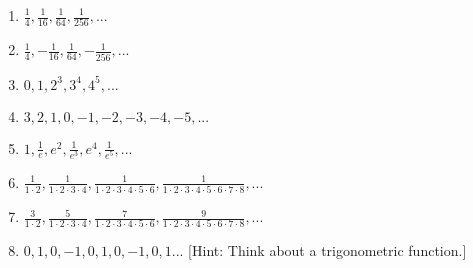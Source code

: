 \documentclass[12pt]{article}
\newif\ifans
\begin{document}
\begin{enumerate}

\item $\frac{1}{4}, \frac{1}{16}, \frac{1}{64}, \frac{1}{256}, ...$

\ifans{\fbox{\parbox{1\linewidth}{ $\left\{ \frac{1}{4^n} \right\}_{n = 1}^{+\infty}$.  Note that any integer can be used as the lower index for a sequence.  So you could describe this sequence with 
$\left\{ \frac{1}{4^{n+1}} \right\}_{n = 0}^{+\infty}$ or even $\left\{ \frac{1}{4^{n+10}} \right\}_{n = -9}^{+\infty}$, although admittedly it is weird to use $-9$ as a starting index unless 
there is some compelling reason to do so.  It is recommended to use either 0 or 1 as a starting index in most cases.  }}} \fi

\item $\frac{1}{4}, -\frac{1}{16}, \frac{1}{64}, -\frac{1}{256},...$

\ifans{\fbox{ $\left\{ (-1)^{n+1} \text{ } \frac{1}{4^n} \right\}_{n = 1}^{+\infty}$  }} \fi

\item $0, 1, 2^3, 3^4, 4^5, ...$

\ifans{\fbox{ $\left\{ n^{n+1} \right\}_{n = 0}^{+\infty}$  }} \fi

\item $3, 2, 1, 0, -1, -2, -3, -4, -5, ...$

\ifans{\fbox{ $\left\{ 4-n \right\}_{n = 1}^{+\infty}$  }} \fi

\item $1, \frac{1}{e}, e^2, \frac{1}{e^3}, e^4, \frac{1}{e^5}, ...$

\ifans{\fbox{ $\left\{  e^{(-1)^nn}  \right\}_{n = 0}^{+\infty}$  }} \fi

\item $\frac{1}{1 \cdot 2}, \frac{1}{1 \cdot 2 \cdot 3 \cdot 4}, \frac{1}{1 \cdot 2 \cdot 3 \cdot 4 \cdot 5 \cdot 6}, \frac{1}{1 \cdot 2 \cdot 3 \cdot 4 \cdot 5 \cdot 6 \cdot 7 \cdot 8}, ...$

\ifans{\fbox{ $\left\{  \frac{1}{(2n)!} \right\}_{n = 1}^{+\infty}$  }} \fi

\item $\frac{3}{1 \cdot 2}, \frac{5}{1 \cdot 2 \cdot 3 \cdot 4}, \frac{7}{1 \cdot 2 \cdot 3 \cdot 4 \cdot 5 \cdot 6}, \frac{9}{1 \cdot 2 \cdot 3 \cdot 4 \cdot 5 \cdot 6 \cdot 7 \cdot 8}, ...$

\ifans{\fbox{ $\left\{  \frac{2n+1}{(2n)!} \right\}_{n = 1}^{+\infty}$  }} \fi

\item $0, 1, 0, -1, 0, 1, 0, -1, 0, 1 ...$ [Hint: Think about a trigonometric function.]


\end{enumerate}
\end{document}
